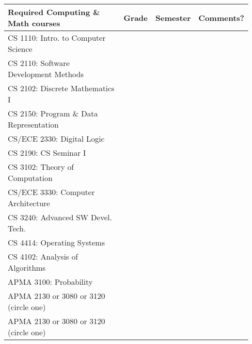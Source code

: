 \documentclass[10pt,letter]{book}
\begin{document}
\small 
\begin{tabular}{|l|l|l|l|} \hline
\bf Required Computing \& Math courses & \bf Grade & \bf Semester &
\bf Comments? \\ \hline \hline
CS 1110: Intro. to Computer Science & & & \\ \hline
CS 2110: Software Development Methods & & & \\ \hline
CS 2102: Discrete Mathematics I & & & \\ \hline
CS 2150: Program \& Data Representation & & & \\ \hline
CS/ECE 2330: Digital Logic & & & \\ \hline
CS 2190: CS Seminar I & & & \\ \hline
CS 3102: Theory of Computation & & & \\ \hline
CS/ECE 3330: Computer Architecture & & & \\ \hline
CS 3240: Advanced SW Devel. Tech. & & & \\ \hline
CS 4414: Operating Systems & & & \\ \hline
CS 4102: Analysis of Algorithms & & & \\ \hline
APMA 3100: Probability & & & \\ \hline
APMA 2130 or 3080 or 3120 (circle one) & & & \\ \hline
APMA 2130 or 3080 or 3120 (circle one) & & & \\ \hline
\end{tabular}
\end{document}
